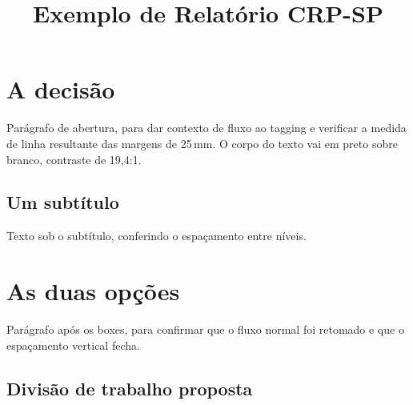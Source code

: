 \documentclass{crpsp-relatorio}
\title{Exemplo de Relatório CRP-SP}
\author{}
\date{}
\begin{document}
\section{A decisão}

Parágrafo de abertura, para dar contexto de fluxo ao tagging e
verificar a medida de linha resultante das margens de 25\,mm.
O corpo do texto vai em preto sobre branco, contraste de 19,4:1.

\subsection{Um subtítulo}

Texto sob o subtítulo, conferindo o espaçamento entre níveis.

\section{As duas opções}

\begin{paralelos}
\end{paralelos}

Parágrafo após os boxes, para confirmar que o fluxo normal foi
retomado e que o espaçamento vertical fecha.

\subsection{Divisão de trabalho proposta}
\end{document}

